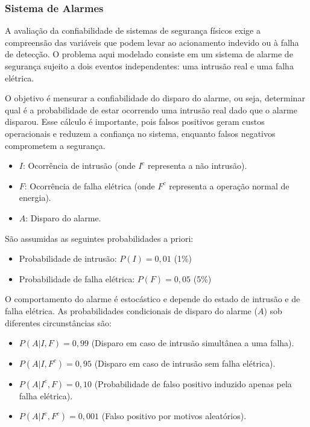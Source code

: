 \subsubsection{Sistema de Alarmes}

A avaliação da confiabilidade de sistemas de segurança físicos exige a compreensão das variáveis que podem levar ao acionamento indevido ou à falha de detecção. O problema aqui modelado consiste em um sistema de alarme de segurança sujeito a dois eventos independentes: uma intrusão real e uma falha elétrica. 

O objetivo é mensurar a confiabilidade do disparo do alarme, ou seja, determinar qual é a probabilidade de estar ocorrendo uma intrusão real dado que o alarme disparou. Esse cálculo é importante, pois falsos positivos geram custos operacionais e reduzem a confiança no sistema, enquanto falsos negativos comprometem a segurança.

\begin{itemize}
	\item $I$: Ocorrência de intrusão (onde $I^c$ representa a não intrusão).
	\item $F$: Ocorrência de falha elétrica (onde $F^c$ representa a operação normal de energia).
	\item $A$: Disparo do alarme.
\end{itemize}

São assumidas as seguintes probabilidades a priori:
\begin{itemize}
	\item Probabilidade de intrusão: $P(I) = 0{,}01$ (1\%)
	\item Probabilidade de falha elétrica: $P(F) = 0{,}05$ (5\%)
\end{itemize}


O comportamento do alarme é estocástico e depende do estado de intrusão e de falha elétrica. As probabilidades condicionais de disparo do alarme ($A$) sob diferentes circunstâncias são:
\begin{itemize}
	\item $P(A|I, F) = 0{,}99$ (Disparo em caso de intrusão simultânea a uma falha).
	\item $P(A|I, F^c) = 0{,}95$ (Disparo em caso de intrusão sem falha elétrica).
	\item $P(A|I^c, F) = 0{,}10$ (Probabilidade de falso positivo induzido apenas pela falha elétrica).
	\item $P(A|I^c, F^c) = 0{,}001$ (Falso positivo por motivos aleatórios).
\end{itemize}


